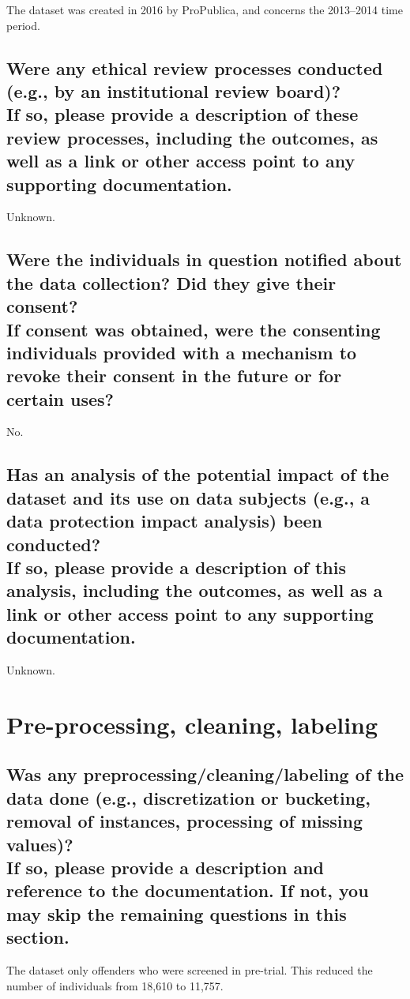 \documentclass[letterpaper, 10 pt, conference]{ieeeconf}  %
\newcommand{\subtitle}[1]{{\\ \small \normalfont \color{purple} #1}}
\begin{document}
The dataset was created in 2016 by ProPublica, and concerns the 2013--2014 time period.

\subsection{Were any ethical review processes conducted (e.g., by an institutional review board)? \subtitle{If so, please provide a description of these review processes, including the outcomes, as well as a link or other access point to any supporting documentation.}}

Unknown.

\subsection{Were the individuals in question notified about the data collection? Did they give their consent? \subtitle{If consent was obtained, were the consenting individuals provided with a mechanism to revoke their consent in the future or for certain uses?}}

No.

\subsection{Has an analysis of the potential impact of the dataset and its use on data subjects (e.g., a data protection impact analysis) been conducted? \subtitle{If so, please provide a description of this analysis, including the outcomes, as well as a link or other access point to any supporting documentation.}}

Unknown.


\section{Pre-processing, cleaning, labeling}

\subsection{Was any preprocessing/cleaning/labeling of the data done (e.g., discretization or bucketing, removal of instances, processing of missing values)? \subtitle{If so, please provide a description and reference to the documentation. If not, you may skip the remaining questions in this section.}}

The dataset only offenders who were screened in pre-trial. This reduced the number of individuals from 18,610 to 11,757.
\end{document}
